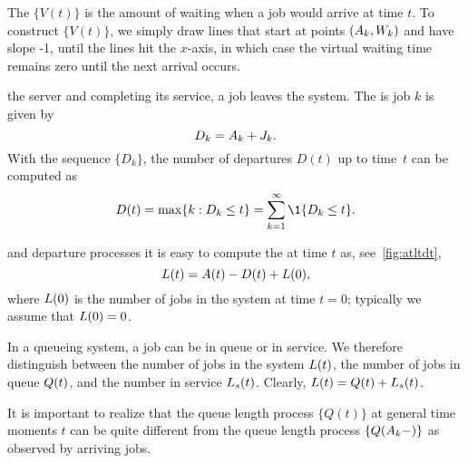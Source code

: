 

The  $\{V(t)\}$ is the amount of waiting when a job would arrive at time $t$.
To construct $\{V(t)\}$, we simply draw lines that start at points $(A_k, W_k)$ and have slope -1, until the lines hit the $x$-axis, in which case the virtual waiting time remains zero until the next arrival occurs.

 the server and completing its service, a job leaves the system.
The  is job $k$ is given by
\begin{equation*}
 D_k = A_{k} + J_k.
\end{equation*}
With the sequence $\{D_k\}$, the number of departures $D(t)$ up to time~$t$ can be computed as
\begin{equation*}
 D(t) = \max\{k : D_k \leq t\} = \sum_{k=1}^\infty \1{D_k \leq t}.
\end{equation*}



 and departure processes it is easy to compute the  at time $t$ as, see~\cref{fig:atltdt},
\begin{equation}\label{eq:14}
 L(t) = A(t) - D(t) + L(0),
\end{equation}
where $L(0)$ is the number of jobs in the system at time $t=0$; typically we assume that $L(0)=0$.

In a queueing system, a job can be in queue or in service.
We therefore distinguish between the number of jobs in the system $L(t)$, the number of jobs in queue $Q(t)$, and the number in service $L_s(t)$.
Clearly, $L(t) = Q(t) + L_s(t)$.

It is important to realize that the queue length process $\{Q(t)\}$ at general time moments $t$ can be quite different from the queue length process $\{ Q(A_k-)\}$ as observed by arriving jobs.


